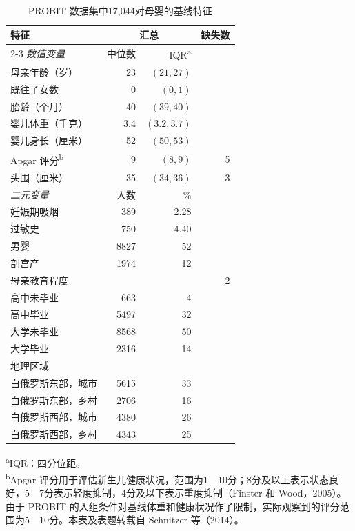 \begin{table}[htbp]
\centering
\caption{PROBIT 数据集中17,044对母婴的基线特征}
\label{tab:ch15-baseline}
\small
\begin{tabular}{lrrr}
\toprule
特征 & \multicolumn{2}{c}{汇总} & 缺失数\\
\cmidrule(lr){2-3}
\textit{数值变量} & 中位数 & IQR\textsuperscript{a} & \\
\midrule
母亲年龄（岁） & 23 & $(21,27)$ & \\
既往子女数 & 0 & $(0,1)$ & \\
胎龄（个月） & 40 & $(39,40)$ & \\
婴儿体重（千克） & 3.4 & $(3.2,3.7)$ & \\
婴儿身长（厘米） & 52 & $(50,53)$ & \\
Apgar 评分\textsuperscript{b} & 9 & $(8,9)$ & 5\\
头围（厘米） & 35 & $(34,36)$ & 3\\
\addlinespace
\textit{二元变量} & 人数 & \% & \\
\midrule
妊娠期吸烟 & 389 & 2.28 & \\
过敏史 & 750 & 4.40 & \\
男婴 & 8827 & 52 & \\
剖宫产 & 1974 & 12 & \\
母亲教育程度 & & & 2\\
\quad 高中未毕业 & 663 & 4 & \\
\quad 高中毕业 & 5497 & 32 & \\
\quad 大学未毕业 & 8568 & 50 & \\
\quad 大学毕业 & 2316 & 14 & \\
地理区域 & & & \\
\quad 白俄罗斯东部，城市 & 5615 & 33 & \\
\quad 白俄罗斯东部，乡村 & 2706 & 16 & \\
\quad 白俄罗斯西部，城市 & 4380 & 26 & \\
\quad 白俄罗斯西部，乡村 & 4343 & 25 & \\
\bottomrule
\end{tabular}
\begin{minipage}{.96\textwidth}
\footnotesize
\textsuperscript{a}IQR：四分位距。\\
\textsuperscript{b}Apgar 评分用于评估新生儿健康状况，范围为1—10分；8分及以上表示状态良好，5—7分表示轻度抑制，4分及以下表示重度抑制（Finster 和 Wood，2005）。由于 PROBIT 的入组条件对基线体重和健康状况作了限制，实际观察到的评分范围为5—10分。本表及表题转载自 Schnitzer 等（2014）。
\end{minipage}
\end{table}

